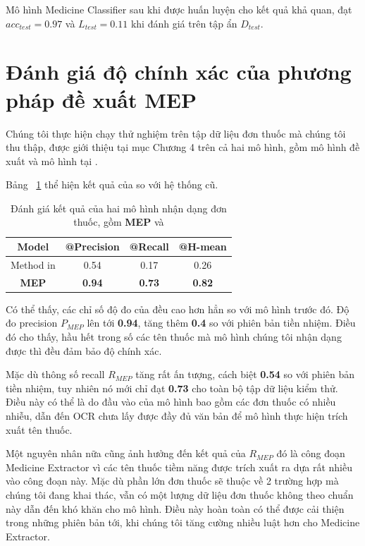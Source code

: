Mô hình Medicine Classifier sau khi được huấn luyện cho kết quả khả quan, đạt $acc_{test} = 0.97$ và $L_{test} = 0.11$ khi đánh giá trên tập ẩn $D_{test}$.

\section{Đánh giá độ chính xác của phương pháp đề xuất MEP}

Chúng tôi thực hiện chạy thử nghiệm trên tập dữ liệu đơn thuốc mà chúng tôi thu thập, được giới thiệu tại mục Chương 4 trên cả hai mô hình, gồm mô hình đề xuất  và mô hình tại \cite{nguyen2021developing}.

Bảng ~\ref{exp:tab_1} thể hiện kết quả của  so với hệ thống cũ. 

\begin{table}
\centering
\caption{Đánh giá kết quả của hai mô hình nhận dạng đơn thuốc, gồm \textbf{MEP} và \cite{nguyen2021developing}}\label{exp:tab_1}
\begin{tabular}{|c|ccc|}
\hline
Model           & @Precision & @Recall & @H-mean  \\ 
\hline
Method in \cite{nguyen2021developing}      & 0.54       & 0.17    & 0.26     \\ 
\hline
\textbf{MEP} & \textbf{0.94}       & \textbf{0.73}    & \textbf{0.82}     \\
\hline
\end{tabular}
\end{table}

Có thể thấy, các chỉ số độ đo của  đều cao hơn hẳn so với mô hình trước đó. Độ đo precision $P_{MEP}$ lên tới \textbf{0.94}, tăng thêm \textbf{0.4} so với phiên bản tiền nhiệm. Điều đó cho thấy, hầu hết trong số các tên thuốc mà mô hình chúng tôi nhận dạng được thì đều đảm bảo độ chính xác. 

Mặc dù thông số recall $R_{MEP}$ tăng rất ấn tượng, cách biệt \textbf{0.54} so với phiên bản tiền nhiệm, tuy nhiên nó mới chỉ đạt \textbf{0.73} cho toàn bộ tập dữ liệu kiểm thử. Điều này có thể là do đầu vào của mô hình bao gồm các đơn thuốc có nhiều nhiễu, dẫn đến OCR chưa lấy được đầy đủ văn bản để mô hình thực hiện trích xuất tên thuốc.

Một nguyên nhân nữa cũng ảnh hưởng đến kết quả của $R_{MEP}$ đó là công đoạn Medicine Extractor vì các tên thuốc tiềm năng được trích xuất ra dựa rất nhiều vào công đoạn này. Mặc dù phần lớn đơn thuốc sẽ thuộc về 2 trường hợp mà chúng tôi đang khai thác, vẫn có một lượng dữ liệu đơn thuốc không theo chuẩn này dẫn đến khó khăn cho mô hình. Điều này hoàn toàn có thể được cải thiện trong những phiên bản tới, khi chúng tôi tăng cường nhiều luật hơn cho Medicine Extractor.

